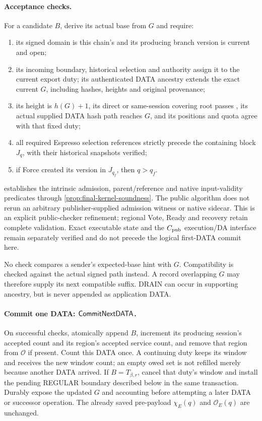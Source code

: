 \paragraph{Acceptance checks.}
For a candidate $B$, derive its actual base from $G$ and require:
\begin{enumerate}[label=(\roman*),itemsep=2pt]
\item its signed domain is this chain's and its producing branch
version is current and open;
\item its incoming boundary, historical selection and authority assign
it to the current export duty; its authenticated DATA ancestry extends
the exact current $G$, including hashes, heights and original provenance;
\item its height is $h(G)+1$, its direct or same-session covering root
passes , its actual supplied DATA hash path reaches
$G$, and its positions and quota agree with that fixed duty;
\item all required Espresso selection references strictly precede
the containing block $J_q$, with their historical snapshots verified;
\item if Force created its version in $J_{q_f}$, then $q>q_f$.
\end{enumerate}
 establishes the intrinsic admission, parent/reference
and native input-validity predicates through
\cref{prop:final-kernel-soundness}. The public algorithm does not rerun an
arbitrary publisher-supplied admission witness or native sidecar. This
is an explicit public-checker refinement; regional Vote, Ready and
recovery retain complete validation. Exact executable state and the
$C_{\rm pub}$ execution/DA interface remain separately verified and do
not precede the logical first-DATA commit here.

No check compares a sender's expected-base hint with $G$. Compatibility
is checked against the actual signed path instead. A record overlapping
$G$ may therefore supply its next compatible suffix. DRAIN can occur in
supporting ancestry, but is never appended as application DATA.

\paragraph{Commit one DATA: $\mathsf{CommitNextDATA}$.}
On successful checks, atomically append $B$, increment its producing
session's accepted count and its region's accepted service count, and
remove that region from $\mathcal O$ if present. Count this DATA once.
A continuing duty keeps its window and receives the new window count;
an empty owed set is not refilled merely because another DATA arrived.
If $B=T_{\beta,r}$, cancel that duty's window and install the pending
REGULAR boundary described below in the same transaction. Durably expose
the updated $G$ and accounting before attempting a later DATA or
successor operation. The already saved pre-payload $\chi_E(q)$ and
$\mathcal O_E(q)$ are unchanged.

